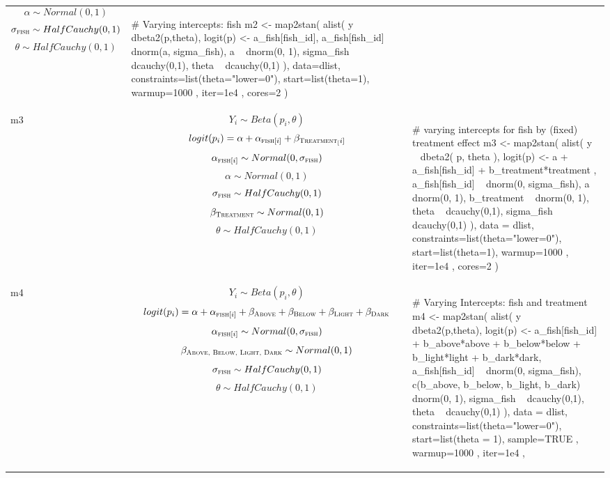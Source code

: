 \begin{longtable}{ l | p{}| p{} }
$$ \alpha \sim Normal(0,1) $$
$$ \sigma_\textsc{fish} \sim HalfCauchy(0,1) $$
$$ \theta \sim HalfCauchy(0, 1) $$
&
{\begin{mylist}
# Varying intercepts: fish
m2 <- map2stan(
  alist(
    y ~ dbeta2(p,theta),
    logit(p) <- a_fish[fish_id],
    a_fish[fish_id] ~ dnorm(a, sigma_fish),
    a ~ dnorm(0, 1),
    sigma_fish ~ dcauchy(0,1),
    theta ~ dcauchy(0,1)
  ),
  data=dlist,
  constraints=list(theta="lower=0"),
  start=list(theta=1), warmup=1000 , iter=1e4 , cores=2 ) 
  \end{mylist}}
\\ %
m3 &
$$ Y_i \sim Beta(p_i, \theta) $$
$$ logit(p_i) = \alpha + \alpha_{\textsc{fish}[i]} + \beta_{\textsc{Treatment}_[i]} $$
$$ \alpha_{\textsc{fish}[i]} \sim Normal(0,\sigma_{\textsc{fish}}) $$
$$ \alpha \sim Normal(0, 1) $$
$$ \sigma_{\textsc{fish}} \sim HalfCauchy(0,1) $$
$$ \beta_{\textsc{Treatment}}  \sim Normal(0,1) $$
$$ \theta \sim HalfCauchy(0, 1) $$
&
{\begin{mylist}
# varying intercepts for fish by (fixed) treatment effect
m3 <- map2stan(
  alist(
    y ~ dbeta2( p, theta ),
    logit(p) <- a + a_fish[fish_id] + b_treatment*treatment ,
    a_fish[fish_id] ~ dnorm(0, sigma_fish),
    a ~ dnorm(0, 1),
    b_treatment ~ dnorm(0, 1),
    theta ~ dcauchy(0,1),
    sigma_fish ~ dcauchy(0,1)
  ),
  data = dlist,
  constraints=list(theta="lower=0"),
  start=list(theta=1), warmup=1000 , iter=1e4 , cores=2 ) \end{mylist}}
\\ %
m4 &
$$ Y_i \sim Beta(p_i, \theta) $$
$$ logit(p_i) = \alpha + \alpha_{\textsc{fish}[i]} + \beta_{\textsc{Above}} + \beta_{\textsc{Below}} + \beta_{\textsc{Light}} + \beta_{\textsc{Dark}}$$
$$ \alpha_{\textsc{fish}[i]} \sim Normal(0,\sigma_{\textsc{fish}}) $$
$$ \beta_{\textsc{Above, Below, Light, Dark}} \sim Normal(0, 1) $$
$$ \sigma_{\textsc{fish}} \sim HalfCauchy(0,1) $$
$$ \theta \sim HalfCauchy(0, 1) $$
&
{\begin{mylist}
# Varying Intercepts: fish and treatment
m4 <- map2stan(
  alist(
    y ~ dbeta2(p,theta),
    logit(p) <- a_fish[fish_id] + b_above*above + b_below*below 
    + b_light*light + b_dark*dark,   
    a_fish[fish_id] ~ dnorm(0, sigma_fish),
    c(b_above, b_below, b_light, b_dark) ~ dnorm(0, 1),
    sigma_fish ~ dcauchy(0,1),
    theta ~ dcauchy(0,1)
  ),
  data = dlist,
  constraints=list(theta="lower=0"),
  start=list(theta = 1),
  sample=TRUE , warmup=1000 , iter=1e4 , 

\end{mylist}}
\end{longtable}
